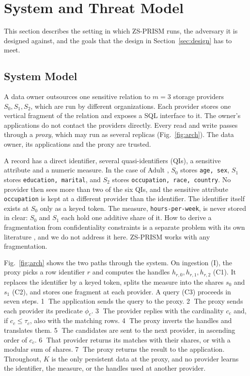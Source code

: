 \documentclass[conference]{IEEEtran}
\newcommand{\sys}{ZS-PRISM}
\begin{document}
\section{System and Threat Model}\label{sec:model}
This section describes the setting in which \sys{} runs, the adversary it is designed against, and the goals that the design in Section~\ref{sec:design} has to meet.

\subsection{System Model}
A data owner outsources one sensitive relation to $m=3$ storage providers $S_0,S_1,S_2$, which are run by different organizations. Each provider stores one vertical fragment of the relation and exposes a SQL interface to it. The owner's applications do not contact the providers directly. Every read and write passes through a \emph{proxy}, which may run as several replicas (Fig.~\ref{fig:arch}). The data owner, its applications and the proxy are trusted.

A record has a direct identifier, several quasi-identifiers (QIs), a sensitive attribute and a numeric measure. In the case of Adult \cite{adult1996}, $S_0$ stores \texttt{age, sex}, $S_1$ stores \texttt{education, marital}, and $S_2$ stores \texttt{occupation, race, country}. No provider then sees more than two of the six QIs, and the sensitive attribute \texttt{occupation} is kept at a different provider than the identifier. The identifier itself exists at $S_0$ only as a keyed token. The measure, \texttt{hours-per-week}, is never stored in clear: $S_0$ and $S_1$ each hold one additive share of it. How to derive a fragmentation from confidentiality constraints is a separate problem with its own literature \cite{ciriani2010combining,ganapathy2012distributing}, and we do not address it here. \sys{} works with any fragmentation.

Fig.~\ref{fig:arch} shows the two paths through the system. On ingestion (I), the proxy picks a row identifier $r$ and computes the handles $h_{r,0},h_{r,1},h_{r,2}$ (C1). It replaces the identifier by a keyed token, splits the measure into the shares $s_0$ and $s_1$ (C2), and stores one fragment at each provider. A query (C3) proceeds in seven steps. \textcircled{\scriptsize 1} The application sends the query to the proxy. \textcircled{\scriptsize 2} The proxy sends each provider its predicate $\phi_c$. \textcircled{\scriptsize 3} The provider replies with the cardinality $c_c$ and, if $c_c\le\tau_c$, also with the matching rows. \textcircled{\scriptsize 4} The proxy inverts the handles and translates them. \textcircled{\scriptsize 5} The candidates are sent to the next provider, in ascending order of $c_c$. \textcircled{\scriptsize 6} That provider returns its matches with their shares, or with a modular sum of shares. \textcircled{\scriptsize 7} The proxy returns the result to the application. Throughout, $K$ is the only persistent data at the proxy, and no provider learns the identifier, the measure, or the handles used at another provider.
\end{document}
